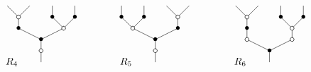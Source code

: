 \documentclass[../main.tex]{subfiles}
\begin{document}
\begin{ex}
    $$
        \xy
        <0.08cm, 0cm>:
        (0.0, 0.0)*{}="1"; %
        (0.0, 5.0)*\cir<2pt>{}="2"; %
        (0.0, 10.0)*=0{\bullet}="3"; %
        (-10.0, 15.0)*=0{\bullet}="4"; %
        (-10.0, 20.0)*\cir<2pt>{}="5"; %
        (-15.0, 25.0)*{}="6"; %
        (-5.0, 25.0)*{}="7"; %
        (10.0, 15.0)*\cir<2pt>{}="8"; %
        (5.0, 20.0)*=0{\bullet}="9"; %
        (5.0, 25.0)*{}="10"; %
        (15.0, 20.0)*=0{\bullet}="11"; %
        (15.0, 25.0)*{}="12"; %
        "1";"2" **\dir{-};
        "2";"3" **\dir{-};
        "3";"4" **\dir{-};
        "4";"5" **\dir{-};
        "5";"6" **\dir{-};
        "5";"7" **\dir{-};
        "3";"8" **\dir{-};
        "8";"9" **\dir{-};
        "9";"10" **\dir{-};
        "8";"11" **\dir{-};
        "11";"12" **\dir{-};
        (-13,0)*{R_{4}};
        \endxy
        \xy
        <0.08cm, 0cm>:
        (-10, 0.0)*{}="1";
        (10, 10.0)*{}="2";
        \endxy
        \xy
        <0.08cm, 0cm>:
        (0.0, 0.0)*{}="1"; %
        (0.0, 5.0)*\cir<2pt>{}="2"; %
        (0.0, 10.0)*=0{\bullet}="3"; %
        (-10.0, 15.0)*\cir<2pt>{}="4"; %
        (-15.0, 20.0)*=0{\bullet}="5"; %
        (-15.0, 25.0)*{}="6"; %
        (-5.0, 20.0)*=0{\bullet}="7"; %
        (-5.0, 25.0)*{}="8"; %
        (10.0, 15.0)*=0{\bullet}="9"; %
        (10.0, 20.0)*\cir<2pt>{}="10"; %
        (5.0, 25.0)*{}="11"; %
        (15.0, 25.0)*{}="12"; %
        "1";"2" **\dir{-};
        "2";"3" **\dir{-};
        "3";"4" **\dir{-};
        "4";"5" **\dir{-};
        "5";"6" **\dir{-};
        "4";"7" **\dir{-};
        "7";"8" **\dir{-};
        "3";"9" **\dir{-};
        "9";"10" **\dir{-};
        "10";"11" **\dir{-};
        "10";"12" **\dir{-};
        (-13,0)*{R_{5}};
        \endxy
        \xy
        <0.08cm, 0cm>:
        (-10, 0.0)*{}="1";
        (10, 10.0)*{}="2";
        \endxy
        \xy
        <0.08cm, 0cm>:
        (0.0, 0.0)*{}="1"; %
        (0.0, 5.0)*=0{\bullet}="2"; %
        (-10.0, 10.0)*\cir<2pt>{}="3"; %
        (-10.0, 15.0)*=0{\bullet}="4"; %
        (-10.0, 20.0)*\cir<2pt>{}="5"; %
        (-15.0, 25.0)*{}="6"; %
        (-5.0, 25.0)*{}="7"; %
        (10.0, 10.0)*\cir<2pt>{}="8"; %
        (10.0, 15.0)*\cir<2pt>{}="9"; %
        (5.0, 20.0)*=0{\bullet}="10"; %
        (5.0, 25.0)*{}="11"; %
        (15.0, 20.0)*=0{\bullet}="12"; %
        (15.0, 25.0)*{}="13"; %
        "1";"2" **\dir{-};
        "2";"3" **\dir{-};
        "3";"4" **\dir{-};
        "4";"5" **\dir{-};
        "5";"6" **\dir{-};
        "5";"7" **\dir{-};
        "2";"8" **\dir{-};
        "8";"9" **\dir{-};
        "9";"10" **\dir{-};
        "10";"11" **\dir{-};
        "9";"12" **\dir{-};
        "12";"13" **\dir{-};
        (-13,0)*{R_{6}};
        \endxy
    $$


\end{ex}
\end{document}
